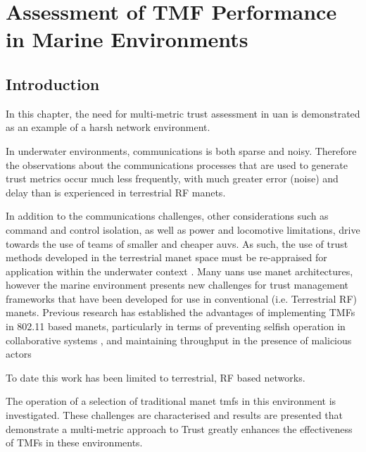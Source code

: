 \def\ChapterTitle{Assessment of TMF Performance in Marine Environments}

\chapter{\ChapterTitle}
\label{Chapter\thechapter}


\section{Introduction}

In this chapter, the need for multi-metric trust assessment in \gls{uan} is demonstrated as an example of a harsh network environment.

In underwater environments, communications is both sparse and noisy.
Therefore the observations about the communications processes that are used to generate trust metrics occur much less frequently, with much greater error (noise) and delay than is experienced in terrestrial RF \glspl{manet}.

In addition to the communications challenges, other considerations such as command and control isolation, as well as power and locomotive limitations, drive towards the use of teams of smaller and cheaper \glspl{auv}.
As such, the use of trust methods developed in the terrestrial \gls{manet} space must be re-appraised for application within the underwater context \cite{Pavan2015}.
Many \glspl{uan} use \gls{manet} architectures, however the marine environment presents new challenges for trust management frameworks that have been developed for use in conventional (i.e. Terrestrial RF) \glspl{manet}.
Previous research has established the advantages of implementing TMFs in 802.11 based \glspl{manet}, particularly in terms of preventing selfish operation in collaborative systems \cite{Li2007}, and maintaining throughput in the presence of malicious actors \cite{Buchegger2002}

To date this work has been limited to terrestrial, RF based networks. 

The operation of a selection of traditional \gls{manet} \glspl{tmf} in this environment is investigated.
These challenges are characterised and results are presented that demonstrate a multi-metric approach to Trust greatly enhances the effectiveness of TMFs in these environments.

